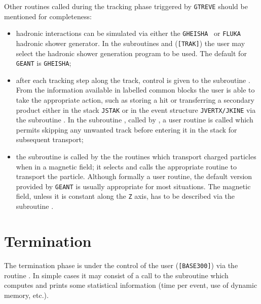 Other routines called during the tracking phase triggered
by {\tt GTREVE} should be mentioned for completeness:
\begin{itemize}
\item
hadronic interactions can be simulated via either the 
{\tt GHEISHA}~\cite{bib-GHEI} or 
{\tt FLUKA}~\cite{bib-FLUK,bib-FLU1,bib-FLU2,bib-FLU3,bib-FLU4}
hadronic shower generator.
In the
subroutines  and  ({\tt [TRAK]}) the user
may select the hadronic shower generation program to be used.
The default for {\tt GEANT} is {\tt GHEISHA};
\item after each tracking step along the
track, control is
given to the subroutine . From the information
available in labelled common blocks the user
is able to take the appropriate action, such as
storing a hit or transferring a secondary product either in the
stack {\tt JSTAK} or in the event structure {\tt JVERTX/JKINE} via
the subroutine 
. In the subroutine ,
called by , a user routine  is called which permits
skipping any unwanted track before entering it in the stack for subsequent
transport;
\item the subroutine
 is called by the the routines which transport charged particles
when in a magnetic field; it selects and calls the appropriate routine to
transport the particle. Although formally a user routine, the default version
provided by {\tt GEANT} is usually appropriate for most situations.
The magnetic field, unless it is constant along the {\tt Z} axis,
has to be described via the subroutine .
\end{itemize}
 
\section{Termination}
 
The termination phase is under the control of the user ({\tt [BASE300]})
via the routine . In 
simple cases it may consist of a call to the subroutine  
which computes and prints some statistical information (time per
event, use of dynamic memory, etc.).
